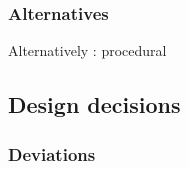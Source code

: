 \subsubsection{Alternatives}
Alternatively : procedural

\subsection{Design decisions}

\subsubsection{Deviations}
\label{deviations_from_bon}

